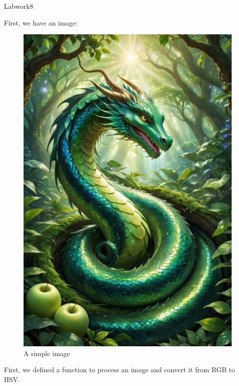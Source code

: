 \documentclass[12pt]{article}
\begin{document}
\begin{center}
    \vspace*{1.8cm}
    \Large
    Labwork8\\
\end{center}

\noindent
First, we have an image:
\begin{figure}[H]
\centering
    \includegraphics[height = 0.5\textheight, keepaspectratio]{images/image.jpeg}
    \caption{A simple image}
\end{figure}


\noindent
First, we defined a function to process an image and convert it from RGB to HSV.
\end{document}
